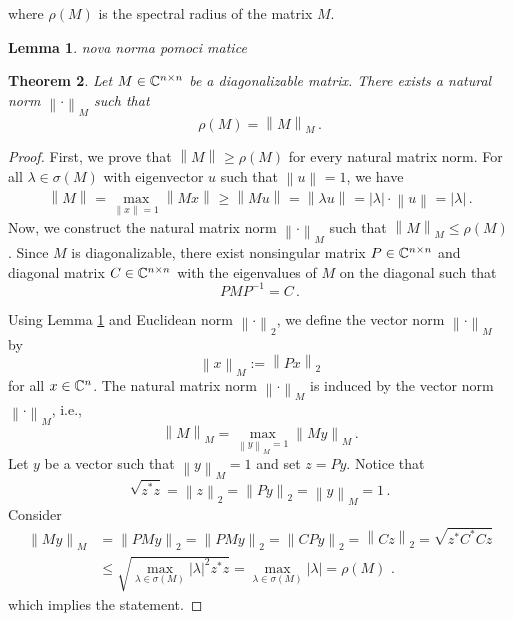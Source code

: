 \documentclass{article}
\newtheorem{theo}{Theorem}
\newtheorem{lem}[theo]{Lemma}
\newcommand{\norm}[2]{\left\lVert#1\right\rVert_{#2}}
\begin{document}
where $\rho(M)$ is the spectral radius of the matrix $M$.

\begin{lem}
\label{lem:vectNorm}
nova norma pomoci matice
\end{lem}


\begin{theo}
Let $M\in\mathbb{C}^{n\times n}$ be a diagonalizable matrix. There exists a natural norm $\norm{\cdot}{M}$ such that 
$$
\rho(M)=\norm{M}{M}\,.
$$
\end{theo}
\begin{proof}
First, we prove that $\norm{M}{}\geq\rho(M)$ for every natural matrix norm. For all $\lambda\in\sigma(M)$ with eigenvector $u$ such that $\norm{u}{}=1$, we have
$$
\norm{M}{}=\max_{\norm{x}{}=1} \norm{Mx}{}\geq \norm{Mu}{}=\norm{\lambda u}{}=|\lambda|\cdot\norm{u}{}=|\lambda|\,.
$$
Now, we construct the natural matrix norm $\norm{\cdot}{M}$ such that $\norm{M}{M}\leq\rho(M)$. Since $M$ is diagonalizable, there exist nonsingular matrix $P\in\mathbb{C}^{n\times n}$ and diagonal matrix $C\in\mathbb{C}^{n\times n}$ with the eigenvalues of $M$ on the diagonal such that 
$$
PMP^{-1}=C\,.
$$ 

Using Lemma \ref{lem:vectNorm} and Euclidean norm $\norm{\cdot}{2}$, we define the vector norm $\norm{\cdot}{M}$ by 
\begin{equation}
\norm{x}{M}:=\norm{Px}{2}
\end{equation}
for all $x\in\mathbb{C}^n$. The natural matrix norm $\norm{\cdot}{M}$ is induced by the vector norm $\norm{\cdot}{M}$, i.e.,
$$
\norm{M}{M}=\max_{\norm{y}{M}=1} \norm{My}{M}\,.
$$
Let $y$ be a  vector such that $\norm{y}{M}=1$ and set $z=Py$. Notice that 
$$
\sqrt{z^*z}=\norm{z}{2}=\norm{Py}{2}=\norm{y}{M}=1\,.
$$
Consider
\begin{align*}
\norm{My}{M}&=\norm{PMy}{2}=\norm{PMy}{2}=\norm{CPy}{2}=\norm{Cz}{2}=\sqrt{z^*C^*Cz}\\
    &\leq \sqrt{\max_{\lambda\in\sigma(M)}|\lambda|^2 z^*z}=\max_{\lambda\in\sigma(M)}|\lambda|=\rho(M)\,\,.
\end{align*}
which implies the statement.
\end{proof}
\end{document}
